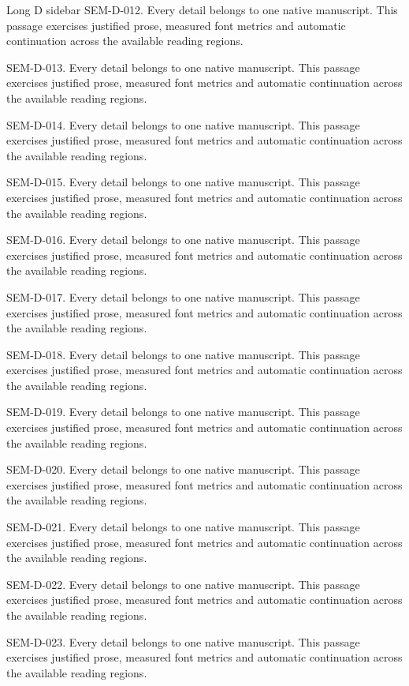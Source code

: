 \begin{m20sidebarwide}[columns=2,id=long-wide2]{Long D sidebar}
SEM-D-012. Every detail belongs to one native manuscript. This passage exercises justified prose, measured font metrics and automatic continuation across the available reading regions.\par
SEM-D-013. Every detail belongs to one native manuscript. This passage exercises justified prose, measured font metrics and automatic continuation across the available reading regions.\par
SEM-D-014. Every detail belongs to one native manuscript. This passage exercises justified prose, measured font metrics and automatic continuation across the available reading regions.\par
SEM-D-015. Every detail belongs to one native manuscript. This passage exercises justified prose, measured font metrics and automatic continuation across the available reading regions.\par
SEM-D-016. Every detail belongs to one native manuscript. This passage exercises justified prose, measured font metrics and automatic continuation across the available reading regions.\par
SEM-D-017. Every detail belongs to one native manuscript. This passage exercises justified prose, measured font metrics and automatic continuation across the available reading regions.\par
SEM-D-018. Every detail belongs to one native manuscript. This passage exercises justified prose, measured font metrics and automatic continuation across the available reading regions.\par
SEM-D-019. Every detail belongs to one native manuscript. This passage exercises justified prose, measured font metrics and automatic continuation across the available reading regions.\par
SEM-D-020. Every detail belongs to one native manuscript. This passage exercises justified prose, measured font metrics and automatic continuation across the available reading regions.\par
SEM-D-021. Every detail belongs to one native manuscript. This passage exercises justified prose, measured font metrics and automatic continuation across the available reading regions.\par
SEM-D-022. Every detail belongs to one native manuscript. This passage exercises justified prose, measured font metrics and automatic continuation across the available reading regions.\par
SEM-D-023. Every detail belongs to one native manuscript. This passage exercises justified prose, measured font metrics and automatic continuation across the available reading regions.\par

\end{m20sidebarwide}
